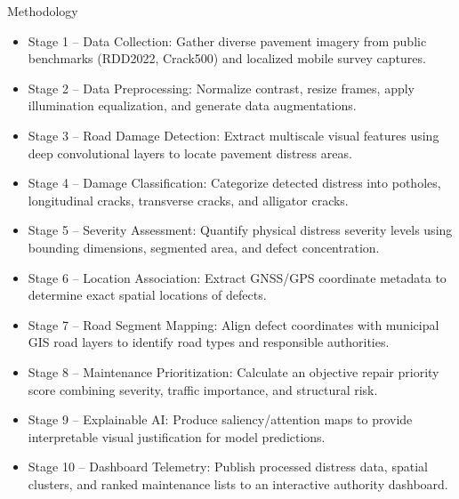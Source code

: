 \documentclass[10pt]{beamer}
\def\textbf#1{#1}%
\def\begin#1{}%
\def\end#1{}%
\begin{document}
\begin{frame}{Methodology}
    \begin{itemize}
        \setlength{\itemsep}{0.32em}
        \item \textbf{Stage 1 -- Data Collection:} Gather diverse pavement imagery from public benchmarks (RDD2022, Crack500) and localized mobile survey captures.
        \item \textbf{Stage 2 -- Data Preprocessing:} Normalize contrast, resize frames, apply illumination equalization, and generate data augmentations.
        \item \textbf{Stage 3 -- Road Damage Detection:} Extract multiscale visual features using deep convolutional layers to locate pavement distress areas.
        \item \textbf{Stage 4 -- Damage Classification:} Categorize detected distress into potholes, longitudinal cracks, transverse cracks, and alligator cracks.
        \item \textbf{Stage 5 -- Severity Assessment:} Quantify physical distress severity levels using bounding dimensions, segmented area, and defect concentration.
        \item \textbf{Stage 6 -- Location Association:} Extract GNSS/GPS coordinate metadata to determine exact spatial locations of defects.
        \item \textbf{Stage 7 -- Road Segment Mapping:} Align defect coordinates with municipal GIS road layers to identify road types and responsible authorities.
        \item \textbf{Stage 8 -- Maintenance Prioritization:} Calculate an objective repair priority score combining severity, traffic importance, and structural risk.
        \item \textbf{Stage 9 -- Explainable AI:} Produce saliency/attention maps to provide interpretable visual justification for model predictions.
        \item \textbf{Stage 10 -- Dashboard Telemetry:} Publish processed distress data, spatial clusters, and ranked maintenance lists to an interactive authority dashboard.
    \end{itemize}
\end{frame}
\end{document}
